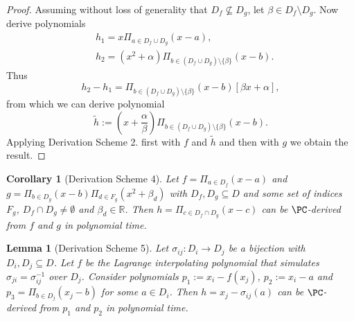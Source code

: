 \documentclass[11pt]{article}
\newtheorem{lemma}[theorem]{Lemma}
\newtheorem{corollary}[theorem]{Corollary}
\begin{document}
\begin{proof}
    Assuming without loss of generality that $D_f \nsubseteq D_g$, let $\beta \in D_f \setminus D_g$. Now derive polynomials
    \begin{align*}
        &h_1 = x \Pi_{a \in D_f \cup D_g} (x-a), \\
        &h_2 = (x^2 + \alpha) \Pi_{b \in (D_f \cup D_g) \setminus \{\beta\}} (x-b).
    \end{align*}
    Thus
    \begin{equation*}
        h_2 - h_1 = \Pi_{b \in (D_f \cup D_g) \setminus \{\beta \}} (x-b)[\beta x + \alpha],
    \end{equation*}
    from which we can derive polynomial
    \begin{equation*}
        \tilde{h} := \left( x + \frac{\alpha}{\beta} \right)\Pi_{b \in (D_f \cup D_g) \setminus \{\beta\}}(x-b).
    \end{equation*}
    Applying Derivation Scheme 2. first with $f$ and $\tilde{h}$ and then with $g$ we obtain the result.
\end{proof}

\begin{corollary}[Derivation Scheme 4]
    Let $f = \Pi_{a \in D_f} (x-a)$ and $g = \Pi_{b \in D_g}(x-b)\Pi_{d \in F_g}(x^2 + \beta_d)$ with $D_f, D_g \subseteq D$ and some set of indices $F_g$, $D_f \cap D_g \neq \emptyset$ and $\beta_d \in \mathbb{R}$. Then $h = \Pi_{c \in D_f \cap D_g}(x-c)$ can be $\PC$-derived from $f$ and $g$ in polynomial time.
\end{corollary}

\begin{lemma}[Derivation Scheme 5]
    Let $\sigma_{ij}:D_i \rightarrow D_j$ be a bijection with $D_i, D_j \subseteq D$. Let $f$ be the Lagrange interpolating polynomial that simulates $\sigma_{ji} = \sigma_{ij}^{-1}$ over $D_j$. Consider polynomials $p_1 := x_i - f(x_j)$, $p_2 := x_i - a$ and $p_3 = \Pi_{b \in D_j}(x_j - b)$ for some $a \in D_i$. Then $h = x_j - \sigma_{ij}(a)$ can be $\PC$-derived from $p_1$ and $p_2$ in polynomial time.
\end{lemma}
\end{document}

